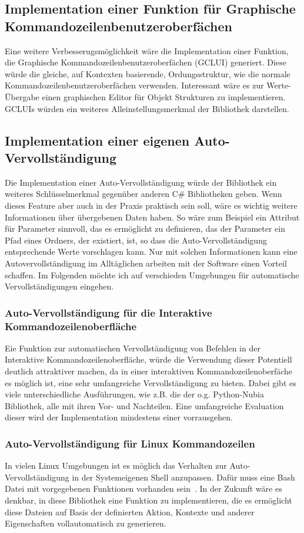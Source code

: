 \subsection{Implementation einer Funktion für Graphische Kommandozeilenbenutzeroberfächen}
Eine weitere Verbesserugsmöglichkeit wäre die Implementation einer Funktion, die Graphische Kommandozeilenbenutzeroberfächen (GCLUI) generiert.
Diese würde die gleiche, auf Kontexten basierende, Ordungsstruktur, wie die normale Kommandozeilenbenutzeroberfächen verwenden.
Interessant wäre es zur Werte-\"Ubergabe einen graphischen Editor für Objekt Strukturen zu implementieren.
GCLUIs würden ein weiteres Alleinstellungsmerkmal der Bibliothek darstellen.
\subsection{Implementation einer eigenen Auto-Vervollständigung}\label{subsec:Autocomplete}
Die Implementation einer Auto-Vervollständigung würde der Bibliothek ein weiteres Schlüsselmerkmal gegenüber anderen C\# Bibliotheken geben.
Wenn dieses Feature aber auch in der Praxis praktisch sein soll, wäre es wichtig weitere Informationen über übergebenen Daten haben.
So wäre zum Beispiel ein Attribut für Parameter sinnvoll, das es ermöglicht zu definieren, das der Parameter ein Pfad eines Ordners, 
der existiert, ist, so dass die Auto-Vervollständigung entsprechende Werte vorschlagen kann.
Nur mit solchen Informationen kann eine Autovervollständigung im Alltäglichen arbeiten mit der Software einen Vorteil schaffen.
Im Folgenden möchte ich auf verschieden Umgebungen für automatische Vervollständigungen eingehen.
\subsubsection{Auto-Vervollständigung für die Interaktive Kommandozeilenoberfläche}
Eie Funktion zur automatischen Vervollständigung von Befehlen in der Interaktive Kommandozeilenoberfläche, würde die Verwendung dieser Potentiell deutlich attraktiver machen, 
da in einer interaktiven Kommandozeilenoberfäche es möglich ist, eine sehr umfangreiche Vervollständigung zu bieten.
Dabei gibt es viele unterschiedliche  Ausführungen, wie z.B. die der o.g. Python-Nubia Bibliothek, alle mit ihren Vor- und Nachteilen.
Eine umfangreiche Evaluation dieser wird der Implementation mindestens einer vorrausgehen. 
\subsubsection{Auto-Vervollständigung für Linux Kommandozeilen}
In vielen Linux Umgebungen ist es möglich das Verhalten zur Auto-Vervollständigung in der Systemeigenen Shell anzupassen.
Dafür muss eine Bash Datei mit vorgegebenen Funktionen vorhanden sein~\cite{BashAutoComplete}.
In der Zukunft wäre es denkbar, in diese Bibliothek eine Funktion zu implementieren, die es ermöglicht diese Dateien auf Basis der definierten Aktion,
Kontexte und anderer Eigenschaften vollautomatisch zu generieren.
